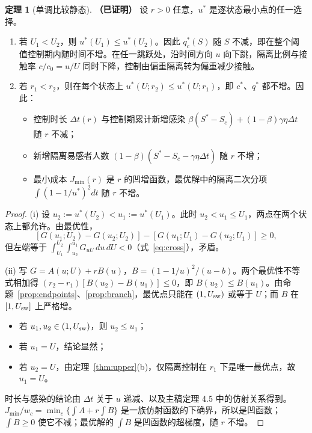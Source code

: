 \documentclass[11pt,a4paper]{ctexart}
\theoremstyle{definition}
\newtheorem{theorem}{定理}[section]
\theoremstyle{definition}
\newcommand{\Usw}{U_{\rm sw}}
\newcommand{\proven}{\textbf{（已证明）}}
\begin{document}
\begin{theorem}[单调比较静态]\label{thm:monotone}\proven
设 $r>0$ 任意，$u^*$ 是逐状态最小点的任一选择。
\begin{enumerate}[label=(\roman*)]
\item 若 $U_1<U_2$，则 $u^*(U_1)\le u^*(U_2)$。因此 $q_c^*(S)$ 随 $S$ 不减，即在整个阈值控制期内随时间不增。在任一跳跃处，沿时间方向 $u$ 向下跳，隔离比例与接触率 $c/c_0=u/U$ 同时下降，控制由偏重隔离转为偏重减少接触。
\item 若 $r_1<r_2$，则在每个状态上 $u^*(U;r_2)\le u^*(U;r_1)$，即 $c^*$、$q^*$ 都不增。因此：
\begin{itemize}
\item 控制时长 $\Delta t(r)$ 与控制期累计新增感染 $\beta(S^*-S_c)+(1-\beta)\gamma\eta\Delta t$ 随 $r$ 不减；
\item 新增隔离易感者人数 $(1-\beta)(S^*-S_c-\gamma\eta\Delta t)$ 随 $r$ 不增；
\item 最小成本 $J_{\min}(r)$ 是 $r$ 的凹增函数，最优解中的隔离二次分项 $\int(1-1/u^*)^2dt$ 随 $r$ 不增。
\end{itemize}
\end{enumerate}
\end{theorem}
\begin{proof}
(i) 设 $u_2:=u^*(U_2)<u_1:=u^*(U_1)$。此时 $u_2<u_1\le U_1$，两点在两个状态上都允许。由最优性，
\[
[G(u_1;U_2)-G(u_2;U_2)]-[G(u_1;U_1)-G(u_2;U_1)]\ge0 ,
\]
但左端等于 $\int_{U_1}^{U_2}\!\int_{u_2}^{u_1}G_{uU}\,du\,dU<0$（式~\eqref{eq:cross}），矛盾。

(ii) 写 $G=A(u;U)+rB(u)$，$B=(1-1/u)^2/(u-b)$。两个最优性不等式相加得 $(r_2-r_1)[B(u_2)-B(u_1)]\le0$，即 $B(u_2)\le B(u_1)$。由命题~\ref{prop:endpoints}、\ref{prop:branch}，最优点只能在 $(1,\Usw)$ 或等于 $U$；而 $B$ 在 $[1,\Usw]$ 上严格增。
\begin{itemize}
\item 若 $u_1,u_2\in(1,\Usw)$，则 $u_2\le u_1$；
\item 若 $u_1=U$，结论显然；
\item 若 $u_2=U$，由定理~\ref{thm:upper}(b)，仅隔离控制在 $r_1$ 下是唯一最优点，故 $u_1=U$。
\end{itemize}
时长与感染的结论由 $\Delta t$ 关于 $u$ 递减、以及主稿定理 4.5 中的仿射关系得到。$J_{\min}/w_c=\min_c\{\int A+r\int B\}$ 是一族仿射函数的下确界，所以是凹函数；$\int B\ge0$ 使它不减；最优解的 $\int B$ 是凹函数的超梯度，随 $r$ 不增。
\end{proof}

\end{document}
